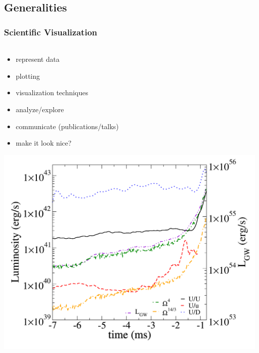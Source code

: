

\subsection{Generalities}
\begin{frame}
    \frametitle{Scientific Visualization}
    \framesubtitle{}

    \vspace{-2.5mm}
    \begin{columns} %
    \begin{column}{5.325cm}
        \begin{itemize}
                \item represent data
                \item plotting
                \item visualization techniques
                \item analyze/explore
                \item communicate (publications/talks)
                \item make it look nice?
        \end{itemize}

        \centering
        \includegraphics[width=.5\columnwidth]{figs/plots/mpc/figure3_B}


\end{column}
\end{columns}
\end{frame}
